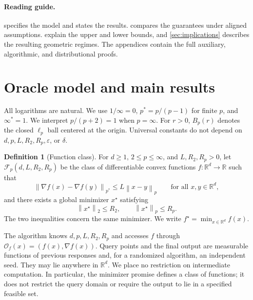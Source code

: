 \documentclass[11pt]{article}
\newcommand{\R}{\mathbb{R}}
\newcommand{\cF}{\mathcal{F}}
\newcommand{\cO}{\mathcal{O}}
\newcommand{\norm}[2]{\left\lVert #1\right\rVert_{#2}}
\newcommand{\eps}{\varepsilon}
\theoremstyle{definition}
\newtheorem{definition}[definition]{Definition}
\theoremstyle{remark}
\begin{document}
\paragraph{Reading guide.}
 specifies the model and states the results.
 compares the guarantees under aligned assumptions.
 explain the upper and lower bounds, and
\cref{sec:implications} describes the resulting geometric regimes.
The appendices contain the full auxiliary, algorithmic, and
distributional proofs.


\section{Oracle model and main results}
\label{sec:model-results}

All logarithms are natural. We use $1/\infty=0$, $p^*=p/(p-1)$ for finite
$p$, and $\infty^*=1$. We interpret $p/(p+2)=1$ when $p=\infty$.
For $r>0$, $B_p(r)$ denotes the closed $\ell_p$
ball centered at the origin. Universal constants do not depend on
$d,p,L,R_2,R_p,\eps$, or $\delta$.

\begin{definition}[Function class]
\label{def:class}
For $d\ge1$, $2\le p\le\infty$, and $L,R_2,R_p>0$, let
$\cF_p(d,L,R_2,R_p)$ be the class of differentiable convex functions
$f:\R^d\to\R$ such that
\begin{equation}
\label{eq:model-smooth}
 \norm{\nabla f(x)-\nabla f(y)}{p^*}
 \le L\norm{x-y}{p}\qquad\text{for all }x,y\in\R^d,
\end{equation}
and there exists a global minimizer $x^\star$ satisfying
\begin{equation}
\label{eq:model-radii}
 \norm{x^\star}{2}\le R_2,\qquad \norm{x^\star}{p}\le R_p.
\end{equation}
The two inequalities concern the same minimizer. We write
$f^\star=\min_{x\in\R^d}f(x)$.
\end{definition}

The algorithm knows $d,p,L,R_2,R_p$ and accesses $f$ through
$\cO_f(x)=(f(x),\nabla f(x))$. Query points and the final output are
measurable functions of previous responses and, for a randomized
algorithm, an independent seed. They may lie anywhere in $\R^d$.
We place no restriction on intermediate computation. In particular,
the minimizer promise defines a class of functions; it does not
restrict the query domain or require the output to lie in a specified
feasible set.
\end{document}
